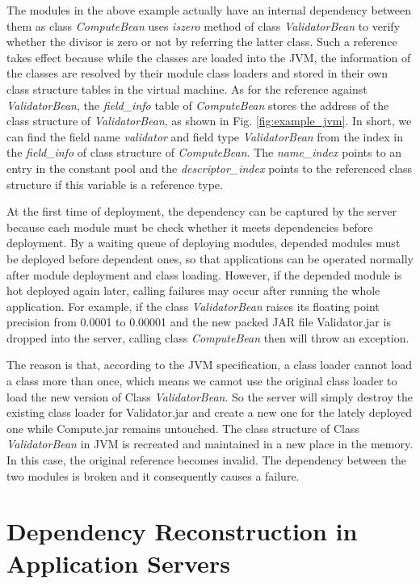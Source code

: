 \documentclass[conference]{IEEEtran}
\begin{document}
The modules in the above example actually have an internal dependency between them as class \emph{ComputeBean} uses \emph{iszero} method of class \emph{ValidatorBean} to verify whether the divisor is zero or not by referring the latter class. Such a reference takes effect because while the classes are loaded into the JVM\cite{jvm}, the information of the classes are resolved by their module class loaders and stored in their own class structure tables in the virtual machine. As for the reference against \emph{ValidatorBean}, the \emph{field\_info} table of \emph{ComputeBean} stores the address of the class structure of \emph{ValidatorBean}, as shown in Fig. \ref{fig:example_jvm}. In short, we can find the field name \emph{validator} and field type \emph{ValidatorBean} from the index in the \emph{field\_info} of class structure of \emph{ComputeBean}. 
The \emph{name\_index} points to an entry in the constant pool and the \emph{descriptor\_index} points to the referenced class structure if this variable is a reference type\cite{jvm_book}. 

At the first time of deployment, the dependency can be captured by the server because each module must be check whether it meets dependencies before deployment. By a waiting queue of deploying modules, depended modules must be deployed before dependent ones, so that applications can be operated normally after module deployment and class loading. However, if the depended module is hot deployed again later, calling failures may occur after running the whole application. For example, if the class \emph{ValidatorBean} raises its floating point precision from 0.0001 to 0.00001 and the new packed JAR file Validator.jar is dropped into the server, calling class \emph{ComputeBean} then will throw an exception. 

The reason is that, according to the JVM specification\cite{jvm_specification}, a class loader cannot load a class more than once, which means we cannot use the original class loader to load the new version of Class \emph{ValidatorBean}. So the server will simply destroy the existing class loader for Validator.jar and create a new one for the lately deployed one while Compute.jar remains untouched. The class structure of Class \emph{ValidatorBean} in JVM is recreated and maintained in a new place in the memory. In this case, the original reference becomes invalid. The dependency between the two modules is broken and it consequently causes a failure.


\section{Dependency Reconstruction in Application Servers\label{sec:reconstructionAS}}
\end{document}
